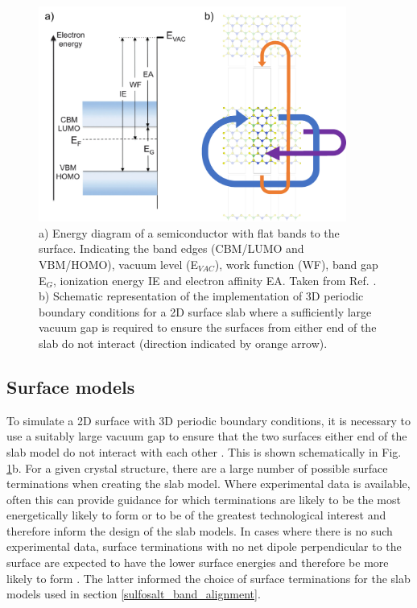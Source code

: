 \documentclass[11pt, twoside]{report}
\begin{document}
\begin{figure}[h!]
  \centering
    \includegraphics[width=0.9\textwidth]{figures/slab_figs.png}
    \caption[a) Energy diagram of a semiconductor with flat bands to the surface. Indicating the band edges (CBM/LUMO and VBM/HOMO), vacuum level (E$_{VAC}$), work function (WF), band gap E$_G$, ionization energy IE and electron affinity EA. b) Schematic representation of the implementation of 3D periodic boundary conditions for a 2D surface slab where a sufficiently large vacuum gap is required to ensure the surfaces from either end of the slab do not interact (direction indicated by orange arrow).]{a) Energy diagram of a semiconductor with flat bands to the surface. Indicating the band edges (CBM/LUMO and VBM/HOMO), vacuum level (E$_{VAC}$), work function (WF), band gap E$_G$, ionization energy IE and electron affinity EA. Taken from Ref. . b) Schematic representation of the implementation of 3D periodic boundary conditions for a 2D surface slab where a sufficiently large vacuum gap is required to ensure the surfaces from either end of the slab do not interact (direction indicated by orange arrow).}
  \label{slabs}
\end{figure}

\subsection{Surface models}
To simulate a 2D surface with 3D periodic boundary conditions, it is necessary to use a suitably large vacuum gap to ensure that the two surfaces either end of the slab model do not interact with each other \cite{Prasad_ch6}. This is shown schematically in Fig. \ref{slabs}b.
For a given crystal structure, there are a large number of possible surface terminations when creating the slab model. Where experimental data is available, often this can provide guidance for which terminations are likely to be the most energetically likely to form or to be of the greatest technological interest and therefore inform the design of the slab models. In cases where there is no such experimental data, surface terminations with no net dipole perpendicular to the surface are expected to have the lower surface energies and therefore be more likely to form \cite{Tasker}. The latter informed the choice of surface terminations for the slab models used in section \ref{sulfosalt_band_alignment}.
\end{document}
